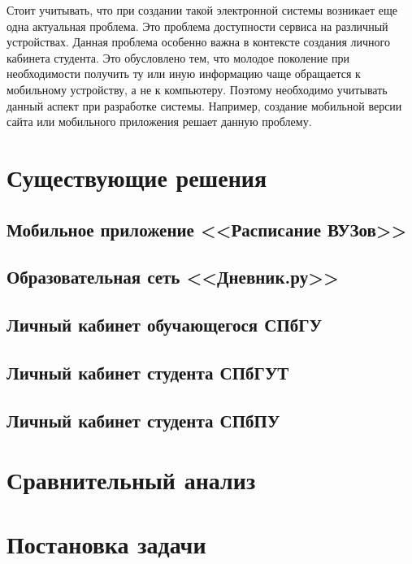 Стоит учитывать, что при создании такой электронной системы возникает еще одна актуальная проблема. Это проблема доступности сервиса на различный устройствах. Данная проблема особенно важна в контексте создания личного кабинета студента. Это обусловлено тем, что молодое поколение при необходимости получить ту или иную информацию чаще обращается к мобильному устройству, а не к компьютеру. Поэтому необходимо учитывать данный аспект при разработке системы. Например, создание мобильной версии сайта или мобильного приложения решает данную проблему.

\section{Существующие решения}

	\subsection{Мобильное приложение <<Расписание ВУЗов>>}
	
	\subsection{Образовательная сеть <<Дневник.ру>>}
	
	\subsection{Личный кабинет обучающегося СПбГУ}
	
	\subsection{Личный кабинет студента СПбГУТ}
	
	\subsection{Личный кабинет студента СПбПУ}

\section{Сравнительный анализ}

\section{Постановка задачи}